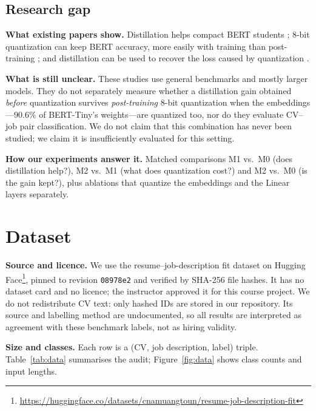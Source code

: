\documentclass[11pt]{article}
\begin{document}
\subsection{Research gap}
\textbf{What existing papers show.} Distillation helps compact BERT students \citep{turc,distilbert,tinybert}; 8-bit quantization can keep BERT accuracy, more easily with training \citep{q8} than post-training \citep{bondarenko}; and distillation can be used to recover the loss caused by quantization \citep{ternary}.

\textbf{What is still unclear.} These studies use general benchmarks and mostly larger models. They do not separately measure whether a distillation gain obtained \emph{before} quantization survives \emph{post-training} 8-bit quantization when the embeddings---90.6\% of BERT-Tiny's weights---are quantized too, nor do they evaluate CV--job pair classification. We do not claim that this combination has never been studied; we claim it is insufficiently evaluated for this setting.

\textbf{How our experiments answer it.} Matched comparisons M1 vs.\ M0 (does distillation help?), M2 vs.\ M1 (what does quantization cost?) and M2 vs.\ M0 (is the gain kept?), plus ablations that quantize the embeddings and the Linear layers separately.

\section{Dataset}
\textbf{Source and licence.} We use the resume--job-description fit dataset on Hugging Face\footnote{\url{https://huggingface.co/datasets/cnamuangtoun/resume-job-description-fit}}, pinned to revision \texttt{08978e2} and verified by SHA-256 file hashes. It has no dataset card and no licence; the instructor approved it for this course project. We do not redistribute CV text: only hashed IDs are stored in our repository. Its source and labelling method are undocumented, so all results are interpreted as agreement with these benchmark labels, not as hiring validity.

\textbf{Size and classes.} Each row is a (CV, job description, label) triple. Table~\ref{tab:data} summarises the audit; Figure~\ref{fig:data} shows class counts and input lengths.
\end{document}
